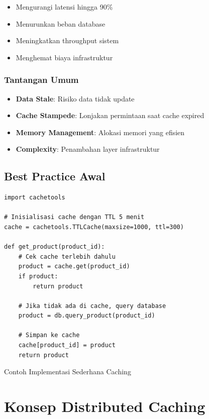 \documentclass[11pt, a4paper]{book}
\begin{document}
	\begin{itemize}
		\item Mengurangi latensi hingga 90\% 
		\item Menurunkan beban database
		\item Meningkatkan throughput sistem
		\item Menghemat biaya infrastruktur
	\end{itemize}
	
	\subsection{Tantangan Umum}
	\label{subsec:tantangan}
	
	\begin{itemize}
		\item \textbf{Data Stale}: Risiko data tidak update
		\item \textbf{Cache Stampede}: Lonjakan permintaan saat cache expired
		\item \textbf{Memory Management}: Alokasi memori yang efisien
		\item \textbf{Complexity}: Penambahan layer infrastruktur
	\end{itemize}
	
	\section*{Best Practice Awal}
	\label{sec:best-practice}
	
	\begin{listing}[H]
	\begin{verbatim}
import cachetools

# Inisialisasi cache dengan TTL 5 menit
cache = cachetools.TTLCache(maxsize=1000, ttl=300)

def get_product(product_id):
	# Cek cache terlebih dahulu
	product = cache.get(product_id)
	if product:
		return product
	
	# Jika tidak ada di cache, query database
	product = db.query_product(product_id)
	
	# Simpan ke cache
	cache[product_id] = product
	return product
	\end{verbatim}
	\caption{Contoh Implementasi Sederhana Caching}
	\end{listing}
	
	\chapter{Konsep Distributed Caching}
	\label{chap:konsep-distributed}
	
\end{document}
